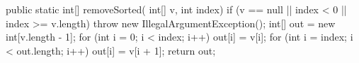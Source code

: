 \begin{unipdcode}[language=Java,
  basicstyle=\ttfamily\scriptsize, numbers=none,
  xleftmargin=0.6em, xrightmargin=0.6em,
  framexleftmargin=0.2em]
public static int[] removeSorted(
        int[] v, int index) {
    if (v == null || index < 0
            || index >= v.length)
        throw new IllegalArgumentException();
    int[] out = new int[v.length - 1];
    for (int i = 0; i < index; i++)
        out[i] = v[i];
    for (int i = index; i < out.length; i++)
        out[i] = v[i + 1];
    return out;
}
\end{unipdcode}
